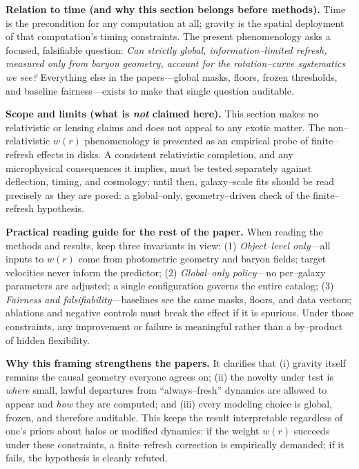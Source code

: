 \documentclass[usenatbib]{mnras}
\begin{document}
\vspace{0.5em}
\noindent\textbf{Relation to time (and why this section belongs before methods).}
Time is the precondition for any computation at all; gravity is the spatial deployment of that computation’s timing constraints. The present phenomenology asks a focused, falsifiable question: \emph{Can strictly global, information–limited refresh, measured only from baryon geometry, account for the rotation–curve systematics we see?}
Everything else in the papers—global masks, floors, frozen thresholds, and baseline fairness—exists to make that single question auditable.

\vspace{0.5em}
\noindent\textbf{Scope and limits (what is \emph{not} claimed here).}
This section makes no relativistic or lensing claims and does not appeal to any exotic matter. The non–relativistic \(w(r)\) phenomenology is presented as an empirical probe of finite–refresh effects in disks. A consistent relativistic completion, and any microphysical consequences it implies, must be tested separately against deflection, timing, and cosmology; until then, galaxy–scale fits should be read precisely as they are posed: a global–only, geometry–driven check of the finite–refresh hypothesis.

\vspace{0.5em}
\noindent\textbf{Practical reading guide for the rest of the paper.}
When reading the methods and results, keep three invariants in view:
(1) \emph{Object–level only}—all inputs to \(w(r)\) come from photometric geometry and baryon fields; target velocities never inform the predictor;
(2) \emph{Global–only policy}—no per–galaxy parameters are adjusted; a single configuration governs the entire catalog;
(3) \emph{Fairness and falsifiability}—baselines see the same masks, floors, and data vectors; ablations and negative controls must break the effect if it is spurious.
Under those constraints, any improvement or failure is meaningful rather than a by–product of hidden flexibility.

\vspace{0.5em}
\noindent\textbf{Why this framing strengthens the papers.}
It clarifies that (i) gravity itself remains the causal geometry everyone agrees on; (ii) the novelty under test is \emph{where} small, lawful departures from “always–fresh” dynamics are allowed to appear and \emph{how} they are computed; and (iii) every modeling choice is global, frozen, and therefore auditable.
This keeps the result interpretable regardless of one’s priors about halos or modified dynamics: if the weight \(w(r)\) succeeds under these constraints, a finite–refresh correction is empirically demanded; if it fails, the hypothesis is cleanly refuted.
\end{document}
